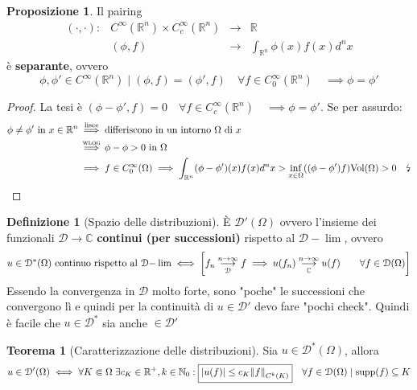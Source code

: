 \documentclass[a4paper,10pt]{article}
\theoremstyle{definition}
\newcommand{\na}{\mathbb{N}} %
\newcommand{\re}{\mathbb{R}} %
\newcommand{\im}{\mathbb{C}} %
\newcommand{\supp}{\text{supp}} %
\newcommand{\limm}[2]{\overunderset{#1\to\infty}{#2}{\longrightarrow}} %
\newcommand{\noun}[1]{\textsc{#1}}
\theoremstyle{indentdefinition}
\newtheorem{defn}{Definizione}[section]
\theoremstyle{indenttheorem}
\newtheorem{thm}{Teorema}
\newtheorem{prop}{Proposizione}
\theoremstyle{myremark}
\theoremstyle{indentgeneral}
\newenvironment{myboxed} 
{\noindent\begin{lrbox}{\mybox}\begin{minipage}{\textwidth}}
{\end{minipage}\end{lrbox}\fbox{\usebox{\mybox}}}
\begin{document}
\begin{myboxed}
    \begin{prop}
        Il pairing
        $$\begin{array}{cccc}
           (\cdot,\cdot):& C^\infty(\re^n)\times C^\infty_c(\re^n) &\to & \re  \\
             & (\phi,f) & \to & \int_{\re^n}\phi(x) f(x)d^nx
        \end{array}$$
        è \textbf{separante}, ovvero
        $$\phi,\phi'\in C^\infty(\re^n)\mid (\phi,f)=(\phi',f)\quad \forall f\in C_0^\infty(\re^n)\quad\implies\phi=\phi'$$
    \end{prop}
\end{myboxed}
    \begin{proof}
    La tesi è $(\phi-\phi',f)=0\quad \forall f\in C_c^\infty(\re^n)\quad\implies\phi=\phi'$. Se per assurdo:
        \begin{align*}
            \phi\ne\phi' \text{ in }x\in\re^n 
            &\overset{\text{lisce}}{\implies} \text{differiscono in un intorno $\Omega$ di $x$}\\
            &\overset{\noun{wlog}}{\implies}\phi-\phi>0 \text{ in }\Omega\\
            &\implies f\in  C_0^\infty(\Omega) \implies \int_{\re^n}(\phi-\phi')(x)f(x)d^nx>\inf_{x\in\Omega}((\phi-\phi')f)\text{Vol}(\Omega)>0\quad \text{\lightning}
        \end{align*}
    \end{proof}

    \begin{defn}[Spazio delle distribuzioni] È $\mathcal{D}'(\Omega)$ ovvero l'insieme dei funzionali $\mathcal{D}\to\im$ \textbf{continui (per successioni)} rispetto al $\mathcal{D-}\lim$, ovvero
    $$u\in\mathcal{D}^*(\Omega) \text{ continuo rispetto al }\mathcal{D-}\lim\iff\left[ f_n\limm{n}{\mathcal{D}}f\implies u(f_n)\limm{n}{\im}u(f)\qquad\forall f\in\mathcal{D}(\Omega)\right] $$
        Essendo la convergenza in $\mathcal{D}$ molto forte, sono "poche" le successioni che convergono lì e quindi per la continuità di $u\in\mathcal{D}'$ devo fare "pochi check". Quindi è facile che $u\in\mathcal{D}^*$ sia anche $\in\mathcal{D}'$
    \end{defn}

    \begin{myboxed}
        \begin{thm}[Caratterizzazione delle distribuzioni]\label{thm-caratterizzazione_distribuzioni} Sia
            $u\in\mathcal{D}^*(\Omega)$, allora $$u\in\mathcal{D}'(\Omega) \iff\forall K\Subset \Omega\;\exists c_K\in\re^+,k\in\na_0:\boxed{\abs{u(f)}\le c_K\norm{f}_{C^k(K)}}\quad \forall f\in\mathcal{D}(\Omega)\mid\supp(f)\subseteq K$$
        \end{thm}
    \end{myboxed}
\end{document}

